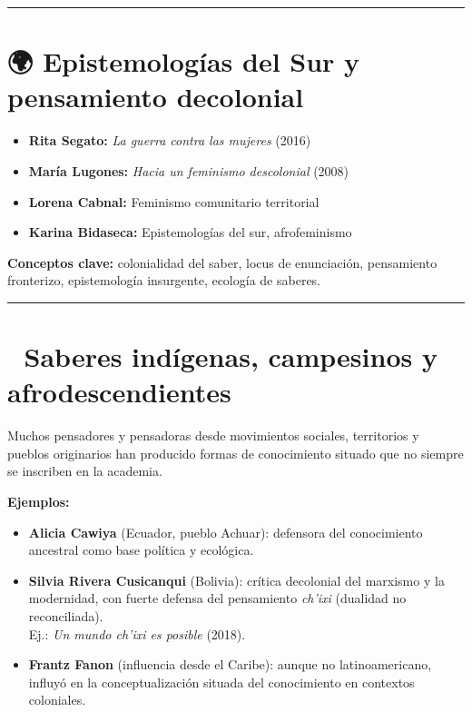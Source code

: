 \documentclass[
  letterpaper,
  DIV=11,
  numbers=noendperiod]{scrreprt}
\providecommand{\tightlist}{%
  \setlength{\itemsep}{0pt}\setlength{\parskip}{0pt}}
\begin{document}
\begin{center}\rule{0.5\linewidth}{0.5pt}\end{center}

\section{🌍 Epistemologías del Sur y pensamiento
decolonial}\label{epistemologuxedas-del-sur-y-pensamiento-decolonial}

\begin{itemize}
\tightlist
\item
  \textbf{Rita Segato:} \emph{La guerra contra las mujeres} (2016)\\
\item
  \textbf{María Lugones:} \emph{Hacia un feminismo descolonial} (2008)\\
\item
  \textbf{Lorena Cabnal:} Feminismo comunitario territorial\\
\item
  \textbf{Karina Bidaseca:} Epistemologías del sur, afrofeminismo
\end{itemize}

\textbf{Conceptos clave:} colonialidad del saber, locus de enunciación,
pensamiento fronterizo, epistemología insurgente, ecología de saberes.

\begin{center}\rule{0.5\linewidth}{0.5pt}\end{center}

\section{🌱 Saberes indígenas, campesinos y
afrodescendientes}\label{saberes-induxedgenas-campesinos-y-afrodescendientes}

Muchos pensadores y pensadoras desde movimientos sociales, territorios y
pueblos originarios han producido formas de conocimiento situado que no
siempre se inscriben en la academia.

\textbf{Ejemplos:}

\begin{itemize}
\tightlist
\item
  \textbf{Alicia Cawiya} (Ecuador, pueblo Achuar): defensora del
  conocimiento ancestral como base política y ecológica.
\item
  \textbf{Silvia Rivera Cusicanqui} (Bolivia): crítica decolonial del
  marxismo y la modernidad, con fuerte defensa del pensamiento
  \emph{ch'ixi} (dualidad no reconciliada).\\
  Ej.: \emph{Un mundo ch'ixi es posible} (2018).
\item
  \textbf{Frantz Fanon} (influencia desde el Caribe): aunque no
  latinoamericano, influyó en la conceptualización situada del
  conocimiento en contextos coloniales.
\end{itemize}
\end{document}
